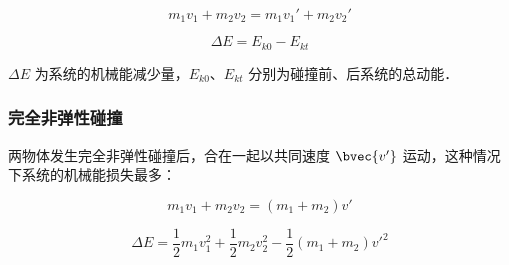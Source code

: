 \begin{equation}
m_1v_1+m_2v_2=m_1v_1'+m_2v_2'
\end{equation}

\begin{equation}
\Delta E = E_{k0}-E_{kt}
\end{equation}

$\Delta E$ 为系统的机械能减少量，$E_{k0}$、$ E_{kt}$ 分别为碰撞前、后系统的总动能．

\subsubsection{完全非弹性碰撞}

两物体发生完全非弹性碰撞后，合在一起以共同速度 $\bvec {v'}$ 运动，这种情况下系统的机械能损失最多：

\begin{equation}
m_1v_1+m_2v_2=(m_1+m_2)v'
\end{equation}

\begin{equation}
\Delta E=\frac12m_1v_1^2+\frac12m_2v_2^2-\frac12(m_1+m_2)v'^2
\end{equation}

